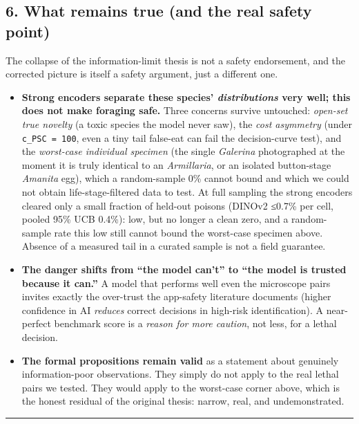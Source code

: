 \subsection{6. What remains true (and the real safety
point)}\label{what-remains-true-and-the-real-safety-point}

The collapse of the information-limit thesis is not a safety
endorsement, and the corrected picture is itself a safety argument, just
a different one.

\begin{itemize}
\tightlist
\item
  \textbf{Strong encoders separate these species' \emph{distributions}
  very well; this does not make foraging safe.} Three concerns survive
  untouched: \emph{open-set true novelty} (a toxic species the model
  never saw), the \emph{cost asymmetry} (under \texttt{c\_PSC\ =\ 100},
  even a tiny tail false-eat can fail the decision-curve test), and the
  \emph{worst-case individual specimen} (the single \emph{Galerina}
  photographed at the moment it is truly identical to an
  \emph{Armillaria}, or an isolated button-stage \emph{Amanita} egg),
  which a random-sample 0\% cannot bound and which we could not obtain
  life-stage-filtered data to test. At full sampling the strong encoders
  cleared only a small fraction of held-out poisons (DINOv2 ≤0.7\% per
  cell, pooled 95\% UCB 0.4\%): low, but no longer a clean zero, and a
  random-sample rate this low still cannot bound the worst-case specimen
  above. Absence of a measured tail in a curated sample is not a field
  guarantee.
\item
  \textbf{The danger shifts from ``the model can't'' to ``the model is
  trusted because it can.''} A model that performs well even the
  microscope pairs invites exactly the over-trust the app-safety
  literature documents (higher confidence in AI \emph{reduces} correct
  decisions in high-risk identification). A near-perfect benchmark score
  is a \emph{reason for more caution}, not less, for a lethal decision.
\item
  \textbf{The formal propositions remain valid} as a statement about
  genuinely information-poor observations. They simply do not apply to
  the real lethal pairs we tested. They would apply to the worst-case
  corner above, which is the honest residual of the original thesis:
  narrow, real, and undemonstrated.
\end{itemize}

\begin{center}\rule{0.5\linewidth}{0.5pt}\end{center}

